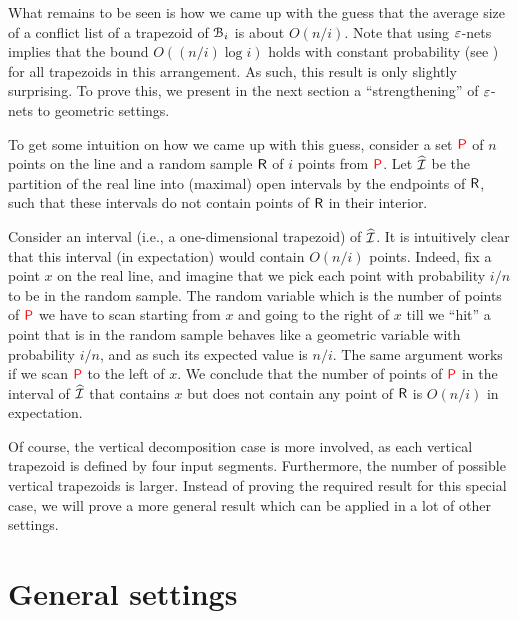 What remains to be seen is how we came up with the guess that the
average size of a conflict list of a trapezoid of $\EuScript{B}_i$ is about
$O(n/i)$.  Note that using ${\varepsilon}$-nets implies that the bound
$O((n/i)\log{i})$ holds with constant probability (see
) for all trapezoids in this arrangement. As
such, this result is only slightly surprising. To prove this, we
present in the next section a ``strengthening'' of ${\varepsilon}$-nets to
geometric settings.

To get some intuition on how we came up with this guess, consider a
set ${{\textcolor{red}{\mathsf{P}}}}$ of $n$ points on the line and a random sample
 $\mathsf{R}$ of $i$ points from ${{\textcolor{red}{\mathsf{P}}}}$. Let
$\widehat{\mathcal{I}}$ be the partition of the real line into (maximal) open
intervals by the endpoints of $\mathsf{R}$, such that these intervals do
not contain points of $\mathsf{R}$ in their interior.

Consider an interval (i.e., a one-dimensional trapezoid) of
$\widehat{\mathcal{I}}$.  It is intuitively clear that this interval (in
expectation) would contain $O(n/i)$ points. Indeed, fix a point $x$ on
the real line, and imagine that we pick each point with probability
$i/n$ to be in the random sample. The random variable which is the
number of points of ${{\textcolor{red}{\mathsf{P}}}}$ we have to scan starting from $x$ and
going to the right of $x$ till we ``hit'' a point that is in the
random sample behaves like a geometric variable with probability
$i/n$, and as such its expected value is $n/i$. The same argument
works if we scan ${{\textcolor{red}{\mathsf{P}}}}$ to the left of $x$. We conclude that the
number of points of ${{\textcolor{red}{\mathsf{P}}}}$ in the interval of $\widehat{\mathcal{I}}$ that
contains $x$ but does not contain any point of $\mathsf{R}$ is $O(n/i)$
in expectation.

Of course, the vertical decomposition case is more involved, as each
vertical trapezoid is defined by four input segments. Furthermore, the
number of possible vertical trapezoids is larger.  Instead of proving
the required result for this special case, we will prove a more
general result which can be applied in a lot of other settings.


\section{General settings}


\newcommand\Tstrut{\rule{0pt}{2.6ex}}%
\newcommand\Bstrut{\rule[-0.9ex]{0pt}{0pt}}%

